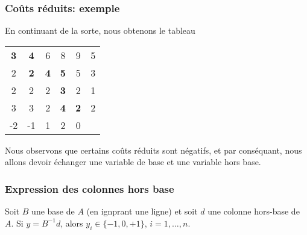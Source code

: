 \documentclass[usepdftitle=false]{beamer}
\begin{document}
\begin{frame}
\frametitle{Coûts réduits: exemple}

En continuant de la sorte, nous obtenons le tableau
\begin{center}
\begin{tabular}{ccccc|c}
{\bf 3} & {\bf 4} & 6 & 8 & 9 & 5 \\
2 & {\bf 2} & {\bf 4} & {\bf 5} & 5 & 3 \\
2 & 2 & 2 & {\bf 3} & 2 & 1 \\
3 & 3 & 2 & {\bf 4} & {\bf 2} & 2 \\
\hline
-2 & -1 & 1 & 2 & 0 & 
\end{tabular}
\end{center}

Nous observons que certains coûts réduits sont négatifs, et par conséquant, nous allons devoir échanger une variable de base et une variable hors base.

\end{frame}

\begin{frame}
\frametitle{Expression des colonnes hors base}

\begin{theorem}
Soit $B$ une base de $A$ (en ignprant une ligne) et soit $d$ une colonne hors-base de $A$.
Si $y = B^{-1}d$, alors $y_i \in \{ -1, 0, +1 \}$, $i = 1,\ldots,n$.
\end{theorem}

\end{frame}
\end{document}
